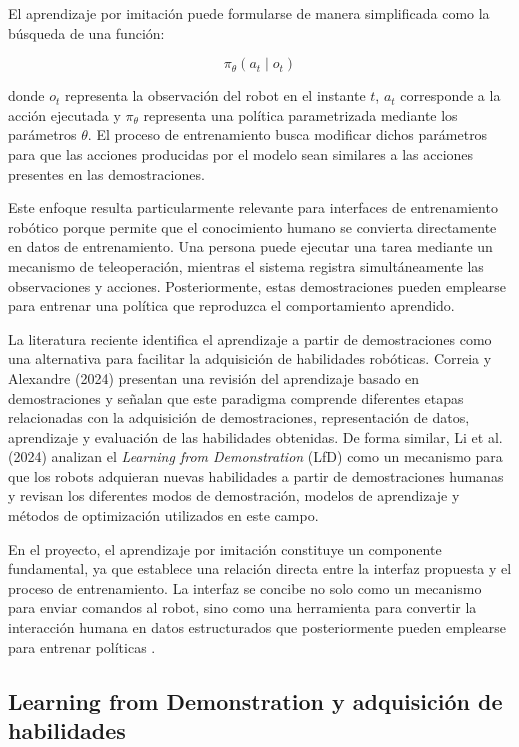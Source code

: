\documentclass[stu,12pt,floatsintext]{apa7}
\begin{document}
El aprendizaje por imitación puede formularse de manera simplificada como la búsqueda de una función:

\begin{equation}
\pi_{\theta}(a_t \mid o_t)
\end{equation}

donde $o_t$ representa la observación del robot en el instante $t$, $a_t$ corresponde a la acción ejecutada y $\pi_{\theta}$ representa una política parametrizada mediante los parámetros $\theta$. El proceso de entrenamiento busca modificar dichos parámetros para que las acciones producidas por el modelo sean similares a las acciones presentes en las demostraciones.

Este enfoque resulta particularmente relevante para interfaces de entrenamiento robótico porque permite que el conocimiento humano se convierta directamente en datos de entrenamiento. Una persona puede ejecutar una tarea mediante un mecanismo de teleoperación, mientras el sistema registra simultáneamente las observaciones y acciones. Posteriormente, estas demostraciones pueden emplearse para entrenar una política que reproduzca el comportamiento aprendido.

La literatura reciente identifica el aprendizaje a partir de demostraciones como una alternativa para facilitar la adquisición de habilidades robóticas. Correia y Alexandre (2024) presentan una revisión del aprendizaje basado en demostraciones y señalan que este paradigma comprende diferentes etapas relacionadas con la adquisición de demostraciones, representación de datos, aprendizaje y evaluación de las habilidades obtenidas. De forma similar, Li et al. (2024) analizan el \textit{Learning from Demonstration} (LfD) como un mecanismo para que los robots adquieran nuevas habilidades a partir de demostraciones humanas y revisan los diferentes modos de demostración, modelos de aprendizaje y métodos de optimización utilizados en este campo.

En el proyecto, el aprendizaje por imitación constituye un componente fundamental, ya que establece una relación directa entre la interfaz propuesta y el proceso de entrenamiento. La interfaz se concibe no solo como un mecanismo para enviar comandos al robot, sino como una herramienta para convertir la interacción humana en datos estructurados que posteriormente pueden emplearse para entrenar políticas \parencite{zare2023surveyimitationlearningalgorithms}.

\subsection{Learning from Demonstration y adquisición de habilidades}
\end{document}
